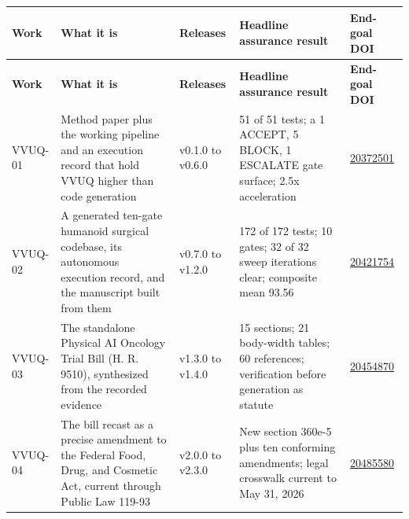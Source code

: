 
{\footnotesize
\begin{xltabular}{\textwidth}{@{}L{1.2cm} Y L{1.6cm} Y L{1.7cm}@{}}
\hline
\textbf{Work} & \textbf{What it is} & \textbf{Releases} & \textbf{Headline
assurance result} & \textbf{End-goal DOI}\\
\hline
\endfirsthead
\hline
\textbf{Work} & \textbf{What it is} & \textbf{Releases} & \textbf{Headline
assurance result} & \textbf{End-goal DOI}\\
\hline
\endhead
\hline
\endlastfoot
VVUQ-01 & Method paper plus the working pipeline and an execution record that hold
VVUQ higher than code generation & v0.1.0 to v0.6.0 & 51 of 51 tests; a 1 ACCEPT,
5 BLOCK, 1 ESCALATE gate surface; 2.5x acceleration &
\href{https://doi.org/10.5281/zenodo.20372501}{20372501}\\
\hline
VVUQ-02 & A generated ten-gate humanoid surgical codebase, its autonomous
execution record, and the manuscript built from them & v0.7.0 to v1.2.0 & 172 of
172 tests; 10 gates; 32 of 32 sweep iterations clear; composite mean 93.56 &
\href{https://doi.org/10.5281/zenodo.20421754}{20421754}\\
\hline
VVUQ-03 & The standalone Physical AI Oncology Trial Bill (H. R. 9510),
synthesized from the recorded evidence & v1.3.0 to v1.4.0 & 15 sections; 21
body-width tables; 60 references; verification before generation as statute &
\href{https://doi.org/10.5281/zenodo.20454870}{20454870}\\
\hline
VVUQ-04 & The bill recast as a precise amendment to the Federal Food, Drug, and
Cosmetic Act, current through Public Law 119-93 & v2.0.0 to v2.3.0 & New section
360e-5 plus ten conforming amendments; legal crosswalk current to May 31, 2026 &
\href{https://doi.org/10.5281/zenodo.20485580}{20485580}\\
\hline
\end{xltabular}}

